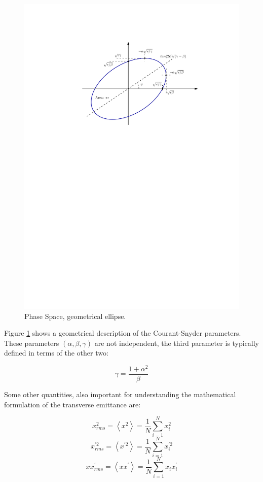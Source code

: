\begin{figure}[h]
    \centering
    \includegraphics[width=0.7\columnwidth]{Figure_GeometricEmittance/GeometricEmittancve.pdf}
    \caption{Phase Space, geometrical ellipse. }
    \label{fig:CouranSnyder}
\end{figure}

    
Figure \ref{fig:CouranSnyder} shows a geometrical description of the Courant-Snyder parameters. These parameters $\left(\alpha, \beta, \gamma \right)$ are not independent, the third parameter is typically defined in terms of the other two: 

\begin{equation}
    \gamma = \frac{1 + \alpha^{2}}{\beta}
\end{equation}

Some other quantities, also important for understanding the mathematical formulation of the transverse emittance are: 

\begin{equation}
    x_{rms}^2 = \left<x^2\right> =\frac{1}{N}\sum_{i=1}^N x_i^2
\end{equation}
\begin{equation}
    x_{rms}^{'2} = \left<x^{'2}\right> = \frac{1}{N}\sum_{i=1}^N x_i^{'2}
\end{equation}
\begin{equation}
    x x^{'}_{rms} =  \left< x x^{'}\right> = \frac{1}{N}\sum_{i = 1}^{N} x_{i} x^{'}_{i}
\end{equation}

